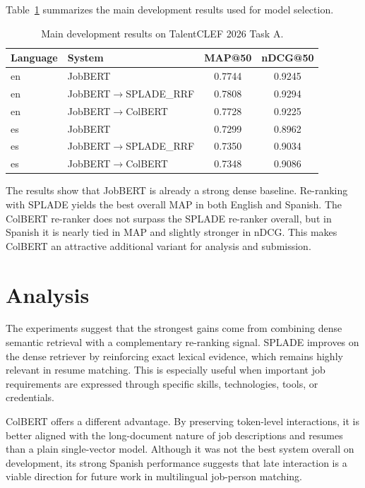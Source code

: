 \documentclass[
]{ceurart}
\begin{document}
Table~\ref{tab:dev-results} summarizes the main development results used for model
selection.

\begin{table}[t]
  \centering
  \caption{Main development results on TalentCLEF 2026 Task A.}
  \label{tab:dev-results}
  \begin{tabular}{llcc}
    \toprule
    Language & System & MAP@50 & nDCG@50 \\
    \midrule
    en & JobBERT & 0.7744 & 0.9245 \\
    en & JobBERT$\rightarrow$SPLADE\_RRF & 0.7808 & 0.9294 \\
    en & JobBERT$\rightarrow$ColBERT & 0.7728 & 0.9225 \\
    \midrule
    es & JobBERT & 0.7299 & 0.8962 \\
    es & JobBERT$\rightarrow$SPLADE\_RRF & 0.7350 & 0.9034 \\
    es & JobBERT$\rightarrow$ColBERT & 0.7348 & 0.9086 \\
    \bottomrule
  \end{tabular}
\end{table}

The results show that JobBERT is already a strong dense baseline. Re-ranking with
SPLADE yields the best overall MAP in both English and Spanish. The ColBERT re-ranker
does not surpass the SPLADE re-ranker overall, but in Spanish it is nearly tied in MAP
and slightly stronger in nDCG. This makes ColBERT an attractive additional variant for
analysis and submission.

\section{Analysis}

The experiments suggest that the strongest gains come from combining dense semantic
retrieval with a complementary re-ranking signal. SPLADE improves on the dense retriever
by reinforcing exact lexical evidence, which remains highly relevant in resume matching.
This is especially useful when important job requirements are expressed through specific
skills, technologies, tools, or credentials.

ColBERT offers a different advantage. By preserving token-level interactions, it is
better aligned with the long-document nature of job descriptions and resumes than a
plain single-vector model. Although it was not the best system overall on development,
its strong Spanish performance suggests that late interaction is a viable direction for
future work in multilingual job-person matching.
\end{document}
